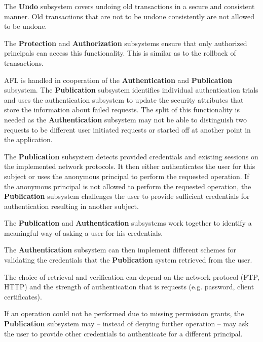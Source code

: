 \documentclass[12pt,english]{scrbook}
\begin{document}

The \textbf{Undo} subsystem covers undoing old transactions in a secure and
consistent manner. Old transactions that are not to be undone consistently
are not allowed to be undone.

The \textbf{Protection} and \textbf{Authorization} subsystems ensure that only
authorized principals can access this functionality. This is similar as to the
rollback of transactions.


AFL is handled in cooperation of the \textbf{Authentication} and
\textbf{Publication} subsystem. The \textbf{Publication} subsystem identifies
individual authentication trials and uses the authentication subsystem to
update the security attributes that store the information about failed
requests. The split of this functionality is needed as the
\textbf{Authentication} subsystem may not be able to distinguish two requests
to be different user initiated requests or started off at another point in the
application.
  


The \textbf{Publication} subsystem detects provided credentials and existing
sessions on the implemented network protocols. It then either authenticates the
user for this subject or uses the anonymous principal to perform the requested
operation. If the anonymous principal is not allowed to perform the requested
operation, the \textbf{Publication} subsystem challenges the user to provide
sufficient credentials for authentication resulting in another subject.


The \textbf{Publication} and \textbf{Authentication} subsystems work together
to identify a meaningful way of asking a user for his credentials. 

The \textbf{Authentication} subsystem can then implement different schemes for
validating the credentials that the \textbf{Publication} system retrieved from
the user.

The choice of retrieval and verification can depend on the network protocol
(FTP, HTTP) and the strength of authentication that is requests (e.g. password,
client certificates).


If an operation could not be performed due to missing permission grants, the
\textbf{Publication} subsystem may -- instead of denying further operation --
may ask the user to provide other credentials to authenticate for a different
principal.
\end{document}
